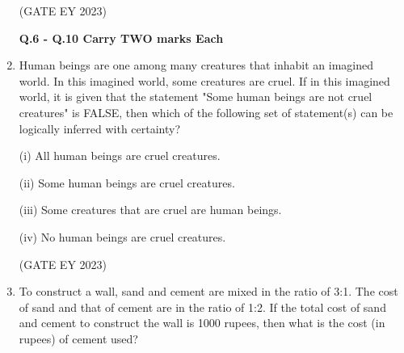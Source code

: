 \documentclass[journal,12pt,onecolumn]{IEEEtran}
\theoremstyle{remark}
\begin{document}
\begin{enumerate}
\begin{enumerate}
\end{enumerate}
\hfill{(GATE EY 2023)}


\textbf{Q.6 - Q.10 Carry TWO marks Each}
 \item Human beings are one among many creatures that inhabit an imagined world. In
this imagined world, some creatures are cruel. If in this imagined world, it is given
that the statement "Some human beings are not cruel creatures" is FALSE, then
which of the following set of statement(s) can be logically inferred with certainty?

(i) All human beings are cruel creatures.

(ii) Some human beings are cruel creatures.

(iii) Some creatures that are cruel are human beings.

(iv) No human beings are cruel creatures.

\begin{enumerate}
\end{enumerate}
\hfill{(GATE EY 2023)}

 \item To construct a wall, sand and cement are mixed in the ratio of 3:1. The cost of sand
and that of cement are in the ratio of 1:2.
If the total cost of sand and cement to construct the wall is 1000 rupees, then what
is the cost (in rupees) of cement used?

\begin{enumerate}
\end{enumerate}
\end{enumerate}
\end{document}

